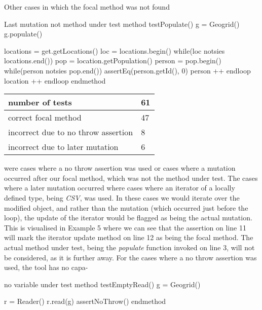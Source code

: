 \documentclass[11pt]{article}
\begin{document}
\begin{multicols}{2}
Other cases in which the focal method was not found 

\begin{sexylisting}{Last mutation not method under test}
method testPopulate()
  g = Geogrid()
  g.populate()

  locations = get.getLocations()
  loc = locations.begin()
  while(loc notsies locations.end())
    pop = location.getPopulation()
    person = pop.begin()
    while(person notsies pop.end())
      assertEq(person.getId(), 0)
      person ++
    endloop
    location ++
  endloop
endmethod
\end{sexylisting}

\begin{center}
	\begin{tabular}{ |p{6.5cm}|p{0.5cm}|  }
		\hline
		number of tests & \hfil61 \\
		\hline
		correct focal method & \hfil47\\
		\hline
		incorrect due to no throw assertion  & \hfil8\\
		\hline
		incorrect due to later mutation & \hfil6\\
		\hline
	\end{tabular}
\end{center}

were cases where a no throw assertion was used or cases where a mutation occurred after our focal method, which was not the method under test. The cases where a later mutation occurred where cases where an iterator of a locally defined type, being \textit{CSV}, was used. In these cases we would iterate over the modified object, and rather than the mutation (which occurred just before the loop), the update of the iterator would be flagged as being the actual mutation. This is visualised in Example 5 where we can see that the assertion on line 11 will mark the iterator update method on line 12 as being the focal method. The actual method under test, being the \textit{populate} function invoked on line 3, will not be considered, as it is further away. For the cases where a no throw assertion was used, the tool has no capa-

\begin{sexylisting}{no variable under test}
method testEmptyRead()
  g = Geogrid()

  r = Reader()
  r.read(g)
  assertNoThrow()
endmethod
\end{sexylisting}


\end{multicols}
\end{document}
